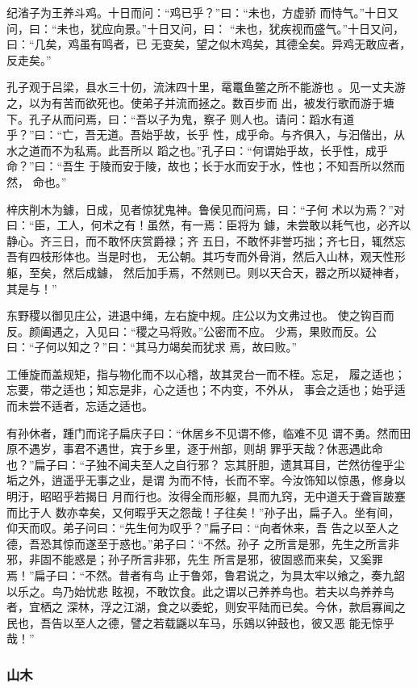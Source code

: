 \documentclass[]{article}
\begin{document}
纪渻子为王养斗鸡。十日而问：``鸡已乎？''曰：``未也，方虚骄
而恃气。''十日又问，曰：``未也，犹应向景。''十日又问，曰：
``未也，犹疾视而盛气。''十日又问，曰：``几矣，鸡虽有鸣者，已
无变矣，望之似木鸡矣，其德全矣。异鸡无敢应者，反走矣。''

孔子观于吕梁，县水三十仞，流沫四十里，鼋鼍鱼鳖之所不能游也
。见一丈夫游之，以为有苦而欲死也。使弟子并流而拯之。数百步而
出，被发行歌而游于塘下。孔子从而问焉，曰：``吾以子为鬼，察子
则人也。请问：蹈水有道乎？''曰：``亡，吾无道。吾始乎故，长乎
性，成乎命。与齐俱入，与汩偕出，从水之道而不为私焉。此吾所以
蹈之也。''孔子曰：``何谓始乎故，长乎性，成乎命？''曰：``吾生
于陵而安于陵，故也；长于水而安于水，性也；不知吾所以然而然， 命也。''

梓庆削木为鐻，日成，见者惊犹鬼神。鲁侯见而问焉，曰：``子何
术以为焉？''对曰：``臣，工人，何术之有！虽然，有一焉：臣将为
鐻，未尝敢以耗气也，必齐以静心。齐三日，而不敢怀庆赏爵禄；齐
五日，不敢怀非誉巧拙；齐七日，辄然忘吾有四枝形体也。当是时也，
无公朝。其巧专而外骨消，然后入山林，观天性形躯，至矣，然后成鐻，
然后加手焉，不然则已。则以天合天，器之所以疑神者，其是与！''

东野稷以御见庄公，进退中绳，左右旋中规。庄公以为文弗过也。
使之钩百而反。颜阖遇之，入见曰：``稷之马将败。''公密而不应。
少焉，果败而反。公曰：``子何以知之？''曰：``其马力竭矣而犹求
焉，故曰败。''

工倕旋而盖规矩，指与物化而不以心稽，故其灵台一而不桎。忘足，
履之适也；忘要，带之适也；知忘是非，心之适也；不内变，不外从，
事会之适也；始乎适而未尝不适者，忘适之适也。

有孙休者，踵门而诧子扁庆子曰：``休居乡不见谓不修，临难不见
谓不勇。然而田原不遇岁，事君不遇世，宾于乡里，逐于州部，则胡
罪乎天哉？休恶遇此命也？''扁子曰：``子独不闻夫至人之自行邪？
忘其肝胆，遗其耳目，芒然彷徨乎尘垢之外，逍遥乎无事之业，是谓
为而不恃，长而不宰。今汝饰知以惊愚，修身以明汙，昭昭乎若揭日
月而行也。汝得全而形躯，具而九窍，无中道夭于聋盲跛蹇而比于人
数亦幸矣，又何暇乎天之怨哉！子往矣！''孙子出，扁子入。坐有间，
仰天而叹。弟子问曰：``先生何为叹乎？''扁子曰∶``向者休来，吾
告之以至人之德，吾恐其惊而遂至于惑也。''弟子曰：``不然。孙子
之所言是邪，先生之所言非邪，非固不能惑是；孙子所言非邪，先生
所言是邪，彼固惑而来矣，又奚罪焉！''扁子曰：``不然。昔者有鸟
止于鲁郊，鲁君说之，为具太牢以飨之，奏九韶以乐之。鸟乃始忧悲
眩视，不敢饮食。此之谓以己养养鸟也。若夫以鸟养养鸟者，宜栖之
深林，浮之江湖，食之以委蛇，则安平陆而已矣。今休，款启寡闻之
民也，吾告以至人之德，譬之若载鼷以车马，乐鴳以钟鼓也，彼又恶
能无惊乎哉！''

\hypertarget{header-n832}{%
\subsubsection{山木}\label{header-n832}}
\end{document}
